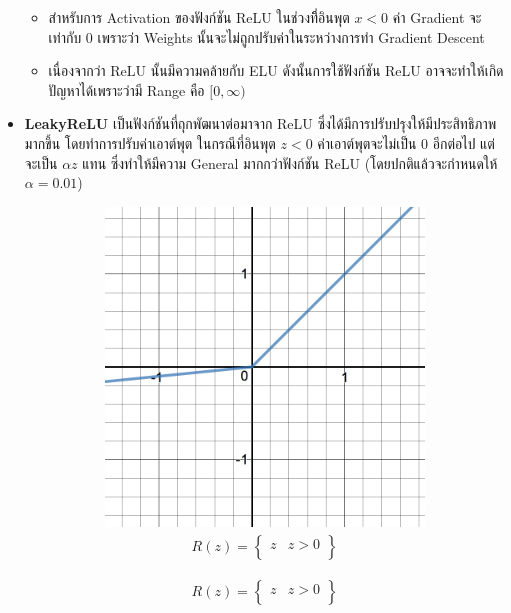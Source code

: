 \begin{itemize}
\begin{itemize}
        \item สำหรับการ Activation ของฟังก์ชัน ReLU ในช่วงที่ิอินพุต $x < 0$ ค่า Gradient จะเท่ากับ 0 เพราะว่า Weights 
        นั้นจะไม่ถูกปรับค่าในระหว่างการทำ Gradient Descent

        \item เนื่องจากว่า ReLU นั้นมีความคล้ายกับ ELU ดังนั้นการใช้ฟังก์ชัน ReLU อาจจะทำให้เกิดปัญหาได้เพราะว่ามี Range คือ 
        $[0,\infty)$
    \end{itemize}

    \item \textbf{LeakyReLU}\autocite{he2015} เป็นฟังก์ชันที่ถุกพัฒนาต่อมาจาก ReLU ซึ่งได้มีการปรับปรุงให้มีประสิทธิภาพมากขึ้น%
    โดยทำการปรับค่าเอาต์พุต ในกรณีที่อินพุต $z < 0$ ค่าเอาต์พุตจะไม่เป็น 0 อีกต่อไป แต่จะเป็น $\alpha z$ แทน ซึ่งทำให้มีความ General 
    มากกว่าฟังก์ชัน ReLU (โดยปกติแล้วจะกำหนดให้ $\alpha = 0.01$)
    \begin{figure}[H]
        \centering
        \begin{subfigure}{0.5\textwidth}
            \centering
            \includegraphics[width=0.9\linewidth]{fig/actfunc_leakyrelu.png}
            \caption{%
                \begin{equation}
                    \begin{split}R(z) = \begin{Bmatrix} z & z > 0 \\

\end{Bmatrix}
\end{split}
\end{equation}}
\end{subfigure}
\end{figure}
\end{itemize}
